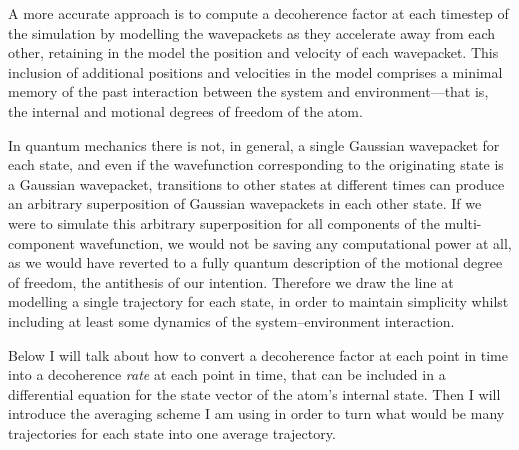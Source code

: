 A more accurate approach is to compute a decoherence factor at each timestep of the simulation by modelling the wavepackets as they accelerate away from each other, retaining in the model the position and velocity of each wavepacket. This inclusion of additional positions and velocities in the model comprises a minimal memory of the past interaction between the system and environment---that is, the internal and motional degrees of freedom of the atom.

In quantum mechanics there is not, in general, a single Gaussian wavepacket for each state, and even if the wavefunction corresponding to the originating state is a Gaussian wavepacket, transitions to other states at different times can produce an arbitrary superposition of Gaussian wavepackets in each other state. If we were to simulate this arbitrary superposition for all components of the multi-component wavefunction, we would not be saving any computational power at all, as we would have reverted to a fully quantum description of the motional degree of freedom, the antithesis of our intention. Therefore we draw the line at modelling a single trajectory for each state, in order to maintain simplicity whilst including at least some dynamics of the system--environment interaction.

Below I will talk about how to convert a decoherence factor at each point in time into a decoherence \emph{rate} at each point in time, that can be included in a differential equation for the state vector of the atom's internal state. Then I will introduce the averaging scheme I am using in order to turn what would be many trajectories for each state into one average trajectory.

